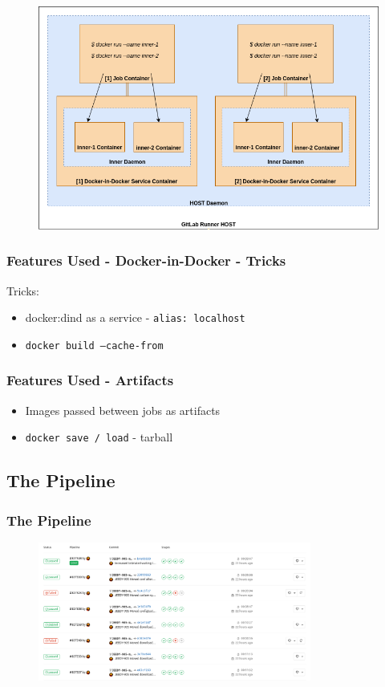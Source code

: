 \documentclass[14pt,aspectratio=169]{beamer}
\begin{document}
\begin{frame}[plain]
  \begin{figure}
    \includegraphics[height=\textheight]{images/dindexplanation.png}
  \end{figure}
\end{frame}

\begin{frame}
  \frametitle{Features Used - Docker-in-Docker - Tricks}
  Tricks:
  \begin{itemize}
    \item docker:dind as a service - \texttt{alias: localhost}
    \item \texttt{docker build --cache-from}
  \end{itemize}
\end{frame}

\begin{frame}
  \frametitle{Features Used - Artifacts}
  \begin{itemize}
    \item Images passed between jobs as artifacts
    \item \texttt{docker save / load} - tarball
  \end{itemize}
\end{frame}

\subsection{The Pipeline}

\begin{frame}
  \frametitle{The Pipeline}
  \begin{figure}
    \includegraphics[width=0.8\textwidth]{images/pipeline_list.png}
  \end{figure}
\end{frame}
\end{document}
